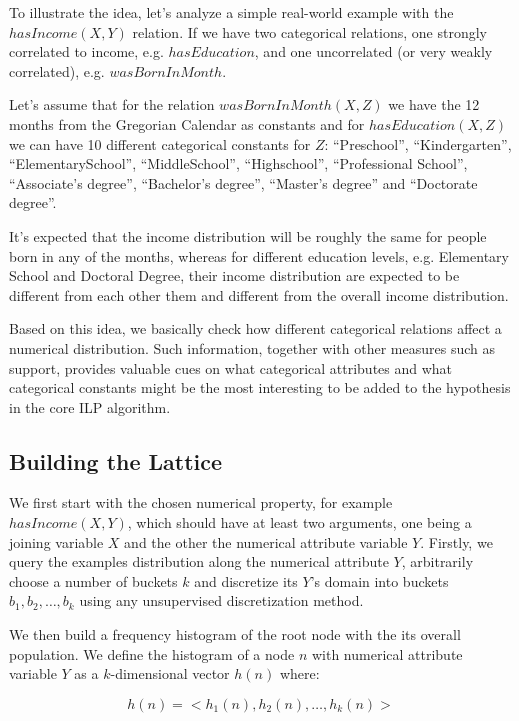 To illustrate the idea, let's analyze a simple real-world example with the $hasIncome(X,Y)$ relation. If we have two
categorical relations, one strongly correlated to income, e.g. $hasEducation$, and one uncorrelated (or very weakly
correlated), e.g. $wasBornInMonth$.

Let's assume that for the relation $wasBornInMonth(X,Z)$ we have the 12 months from the Gregorian Calendar as
constants and for $hasEducation(X,Z)$ we can have 10 different categorical constants for $Z$: ``Preschool'',
``Kindergarten'', ``ElementarySchool'', ``MiddleSchool'', ``Highschool'', ``Professional School'', ``Associate's
degree'', ``Bachelor's degree'', ``Master's degree'' and ``Doctorate degree''. 

It's expected that the income distribution will be roughly the same for people born in any of the months, whereas
for different education levels, e.g. Elementary School and Doctoral Degree, their income distribution are expected to be
different from each other them and different from the overall income distribution.

Based on this idea, we basically check how different categorical relations affect a numerical distribution. Such
information, together with other measures such as support, provides valuable cues on what categorical attributes and
what
categorical constants might be the most interesting to be added to the hypothesis in the core ILP algorithm.

\subsection{Building the Lattice}

We first start with the chosen numerical property, for example $hasIncome(X,Y)$, which should have at least two
arguments, one being a joining variable $X$ and the other the numerical attribute variable $Y$. Firstly, we query the
examples distribution along the numerical attribute $Y$, arbitrarily choose a number of buckets $k$ and discretize
its $Y$'s domain into buckets $b_1, b_2, \dots, b_k$ using any unsupervised discretization method. 

We then build a frequency histogram of the root node with the its overall population. We define the histogram of a node
$n$ with numerical attribute variable $Y$ as a $k$-dimensional vector $h(n)$ where:

\begin{equation}
 h(n)=<h_1(n),h_2(n),\ldots,h_k(n)>
\end{equation}

